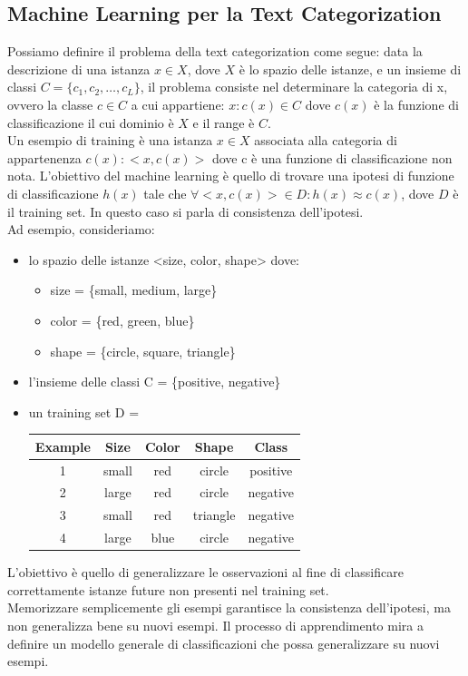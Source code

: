 \documentclass{report}
\begin{document}
	\subsection{Machine Learning per la Text Categorization}
	Possiamo definire il problema della text categorization come segue: data la descrizione di una istanza $x \in X$, dove $X$ è lo spazio delle istanze, e un insieme di classi $C = \{c_1, c_2, \ldots, c_L\}$, il problema consiste nel determinare la categoria di x, ovvero la classe $c \in C$ a cui appartiene: $x: c(x) \in C$ dove $c(x)$ è la funzione di classificazione il cui dominio è $X$ e il range è $C$.\\
	Un esempio di training è una istanza $x \in X$ associata alla categoria di appartenenza $c(x): <x, c(x)>$ dove c è una funzione di classificazione non nota. L'obiettivo del machine learning è quello di trovare una ipotesi di funzione di classificazione $h(x)$ tale che $\forall <x, c(x)> \in D: h(x) \approx c(x)$, dove $D$ è il training set. In questo caso si parla di consistenza dell'ipotesi.
	\vspace{\baselineskip}\\
	Ad esempio, consideriamo:
	\begin{itemize}
		\item lo spazio delle istanze <size, color, shape> dove:
		\begin{itemize}
			\item size = \{small, medium, large\}
			\item color = \{red, green, blue\}
			\item shape = \{circle, square, triangle\}
		\end{itemize}
		\item l'insieme delle classi C = \{positive, negative\}
		\item un training set D = 
		\begin{table}[H]
			\centering
			\begin{tabular}{|c|c|c|c|c|}
				\hline
				\textbf{Example} & \textbf{Size} & \textbf{Color} & \textbf{Shape} & \textbf{Class}\\ \hline
				1 & small & red & circle & positive\\ \hline
				2 & large & red & circle & negative\\ \hline
				3 & small & red & triangle & negative\\ \hline
				4 & large & blue & circle & negative\\ \hline
			\end{tabular}
		\end{table}
	\end{itemize} 
	L'obiettivo è quello di generalizzare le osservazioni al fine di classificare correttamente istanze future non presenti nel training set.\\
	Memorizzare semplicemente gli esempi garantisce la consistenza dell'ipotesi, ma non generalizza bene su nuovi esempi. Il processo di apprendimento mira a definire un modello generale di classificazioni che possa generalizzare su nuovi esempi.\\
\end{document}
